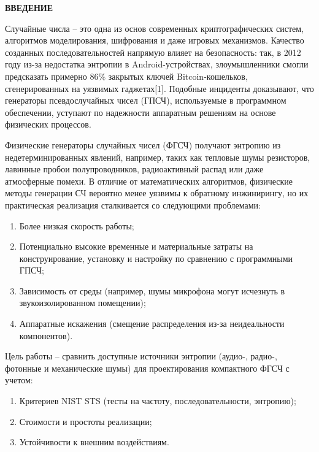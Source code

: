 \clearpage
\setcounter{page}{3}
\onehalfspacing

\textbf{ВВЕДЕНИЕ}

Случайные числа -- это одна из основ современных криптографических
систем, алгоритмов моделирования, шифрования и даже игровых механизмов.
Качество созданных последовательностей напрямую влияет на безопасность:
так, в 2012 году из-за недостатка энтропии в Android-устройствах,
злоумышленники смогли предсказать примерно 86\% закрытых ключей
Bitcoin-кошельков, сгенерированных на уязвимых гаджетах{[}1{]}. Подобные
инциденты доказывают, что генераторы псевдослучайных чисел (ГПСЧ),
используемые в программном обеспечении, уступают по надежности
аппаратным решениям на основе физических процессов.

Физические генераторы случайных чисел (ФГСЧ) получают энтропию из
недетерминированных явлений, например, таких как тепловые шумы
резисторов, лавинные пробои полупроводников, радиоактивный распад или
даже атмосферные помехи. В отличие от математических алгоритмов,
физические методы генерации СЧ вероятно менее уязвимы к обратному
инжинирингу, но их практическая реализация сталкивается со следующими
проблемами:

\begin{enumerate}
\def\labelenumi{\arabic{enumi}.}
\item
  Более низкая скорость работы;
\item
  Потенциально высокие временные и материальные затраты на
  конструирование, установку и настройку по сравнению с программными
  ГПСЧ;
\item
  Зависимость от среды (например, шумы микрофона могут исчезнуть в
  звукоизолированном помещении);
\item
  Аппаратные искажения (смещение распределения из-за неидеальности
  компонентов).
\end{enumerate}

Цель работы -- сравнить доступные источники энтропии (аудио-, радио-,
фотонные и механические шумы) для проектирования компактного ФГСЧ с
учетом:

\begin{enumerate}
\def\labelenumi{\arabic{enumi}.}
\item
  Критериев NIST STS (тесты на частоту, последовательности, энтропию);
\item
  Стоимости и простоты реализации;
\item
  Устойчивости к внешним воздействиям.
\end{enumerate}

